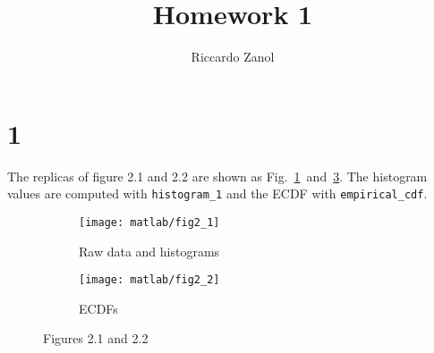 \documentclass{article}
\author{Riccardo Zanol}
\title{Homework 1}
\newcommand{\inlinecode}[1]{\lstinline[basicstyle=\ttfamily,keywordstyle={}]{#1}}
\begin{document}
\maketitle
\section*{1}
  The replicas of figure 2.1 and 2.2 are shown as
  Fig.~\ref{plot_2_1}~and~\ref{plot_2_2}. The histogram values are
  computed with \inlinecode{histogram_1} and the ECDF with
  \inlinecode{empirical_cdf}.
  \begin{figure}[htbp]
    \centering
    \begin{subfigure}{0.5\textwidth}
      \centering
      \texttt{[image: matlab/fig2\_1]}
      \caption{Raw data and histograms}
      \label{plot_2_1}
    \end{subfigure}%
    \begin{subfigure}{0.5\textwidth}
      \centering
      \texttt{[image: matlab/fig2\_2]}
      \caption{ECDFs}
      \label{plot_2_2}
    \end{subfigure}
    \caption{Figures 2.1 and 2.2}
  \end{figure}
    
\end{document}
